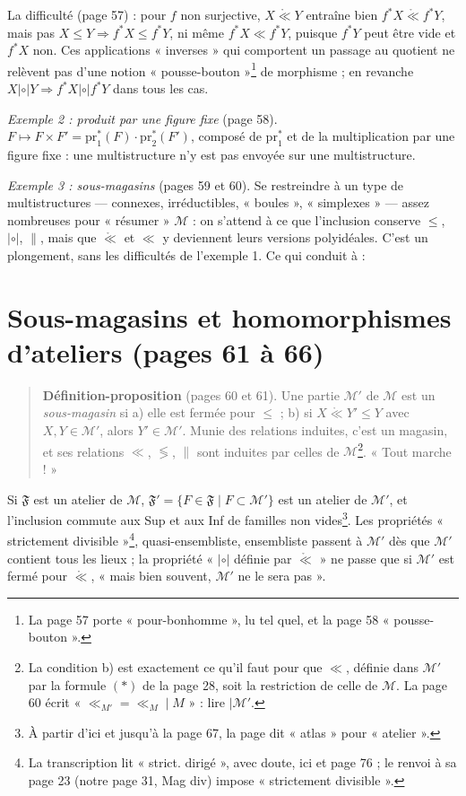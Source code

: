 \documentclass[11pt,a4paper]{article}
\begin{document}
La difficulté (page 57) : pour $f$ non surjective, $X \mathrel{\mathring{\ll}}
Y$ entraîne bien $f^{*}X \mathrel{\mathring{\ll}} f^{*}Y$, mais pas $X \leq Y
\Rightarrow f^{*}X \leq f^{*}Y$, ni même $f^{*}X \ll f^{*}Y$, puisque $f^{*}Y$
peut être vide et $f^{*}X$ non. Ces applications « inverses » qui comportent un
passage au quotient ne relèvent pas d'une notion « pousse-bouton »\footnote{La
page 57 porte « pour-bonhomme », lu tel quel, et la page 58
« pousse-bouton ».} de morphisme ; en revanche $X \mathrel{|\circ|} Y \Rightarrow
f^{*}X \mathrel{|\circ|} f^{*}Y$ dans tous les cas.

\emph{Exemple 2 : produit par une figure fixe} (page 58). $F \mapsto F \times
F' = \mathrm{pr}_{1}^{*}(F) \cdot \mathrm{pr}_{2}^{*}(F')$, composé de
$\mathrm{pr}_{1}^{*}$ et de la multiplication par une figure fixe : une
multistructure n'y est pas envoyée sur une multistructure.

\emph{Exemple 3 : sous-magasins} (pages 59 et 60). Se restreindre à un type de
multistructures --- connexes, irréductibles, « boules », « simplexes » ---
assez nombreuses pour « résumer » $\mathcal{M}$ : on s'attend à ce que
l'inclusion conserve $\leq$, $\mathrel{|\circ|}$, $\parallel$, mais que
$\mathring{\ll}$ et $\ll$ y deviennent leurs versions polyidéales. C'est un
plongement, sans les difficultés de l'exemple 1. Ce qui conduit à :

\section*{Sous-magasins et homomorphismes d'ateliers (pages 61 à 66)}

\begin{quote}
\textbf{Définition-proposition} (pages 60 et 61). Une partie $\mathcal{M}'$ de
$\mathcal{M}$ est un \emph{sous-magasin} si a) elle est fermée pour $\leq$ ;
b) si $X \mathrel{\mathring{\ll}} Y' \leq Y$ avec $X, Y \in \mathcal{M}'$, alors
$Y' \in \mathcal{M}'$. Munie des relations induites, c'est un magasin, et ses
relations $\ll$, $\lessgtr$, $\parallel$ sont induites par celles de
$\mathcal{M}$\footnote{La condition b) est exactement ce qu'il faut pour que
$\ll$, définie dans $\mathcal{M}'$ par la formule $(*)$ de la page 28, soit la
restriction de celle de $\mathcal{M}$. La page 60 écrit « $\ll_{M'} = \ll_{M}
\mid M$ » : lire $\mid \mathcal{M}'$.}. « Tout marche ! »
\end{quote}

Si $\mathfrak{F}$ est un atelier de $\mathcal{M}$, $\mathfrak{F}' = \{F \in
\mathfrak{F} \mid F \subset \mathcal{M}'\}$ est un atelier de $\mathcal{M}'$,
et l'inclusion commute aux Sup et aux Inf de familles non vides\footnote{À
partir d'ici et jusqu'à la page 67, la page dit « atlas » pour « atelier ».}.
Les propriétés « strictement divisible »\footnote{La transcription lit
« strict. dirigé », avec doute, ici et page 76 ; le renvoi à sa page 23 (notre
page 31, Mag div) impose « strictement divisible ».}, quasi-ensembliste,
ensembliste passent à $\mathcal{M}'$ dès que $\mathcal{M}'$ contient tous les
lieux ; la propriété « $\mathrel{|\circ|}$ définie par $\mathring{\ll}$ » ne
passe que si $\mathcal{M}'$ est fermé pour $\mathring{\ll}$, « mais bien
souvent, $\mathcal{M}'$ ne le sera pas ».
\end{document}
